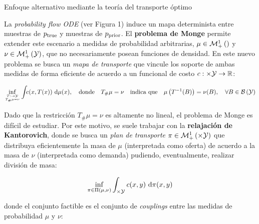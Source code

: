 \documentclass[final]{beamer}
\newlength{\colwidth}
\begin{document}
\begin{frame}[t]
\begin{columns}[t]
\begin{column}{\colwidth}
      \begin{block}{Enfoque alternativo mediante la teoría del transporte óptimo}

        La \textit{probability flow ODE} (ver Figura 1) induce un mapa determinista entre muestras de $p_{\operatorname{true}}$ y muestras de $p_{\operatorname{prior}}$. El \textbf{problema de Monge} permite extender este escenario a medidas de probabilidad arbitrarias, $\mu\in\mathcal{M}_+^1\left(\right)$ y $\nu\in\mathcal{M}_+^1\left(\mathcal{Y}\right)$, que no necesariamente posean funciones de densidad. En este nuevo problema se busca un \textit{mapa de transporte} que vincule los soporte de ambas medidas de forma eficiente de acuerdo a un funcional de costo $c:\times\mathcal{Y}\to\mathbb{R}$:

        \begin{equation*}
          \inf_{\feasible{T:\xspace\to\yspace}{T_\#\mu=\nu}}
          \int_{\xspace} c(x, T(x)) \d\mu(x),
          \quad\text{donde}\quad
          T_\#\mu=\nu\quad\text{indica que}\quad \mu\parent{T^{-1}(B)} = \nu(B),\quad \forall B\in \borel{\yspace}
        \end{equation*}

        Dado que la restricción $T_\#\mu=\nu$ es altamente no lineal, el problema de Monge es difícil de estudiar. Por este motivo, se suele trabajar con la \textbf{relajación de Kantorovich}, donde se busca un \textit{plan de transporte} $\pi\in\probmeasure{\xspace\times\yspace}$ que distribuya eficientemente la masa de $\mu$ (interpretada como oferta) de acuerdo a la masa de $\nu$ (interpretada como demanda) pudiendo, eventualmente, realizar división de masa:

        \noindent
        \begin{minipage}[t]{0.35\textwidth}
        \end{minipage}%
        \hfill
        \begin{minipage}[t]{0.6\textwidth}
          \vspace{0.5cm}
          \begin{equation}
            \label{eq:kantorovich}
            \inf_{\pi \in \Pi(\mu,\nu)} \int_{\times\mathcal{Y}} c(x, y) \,\operatorname{d}\!\pi(x, y)
          \end{equation}

          donde el conjunto factible es el conjunto de \textit{couplings} entre las medidas de probabilidad $\mu$ y $\nu$:


\end{minipage}
\end{block}
\end{column}
\end{columns}
\end{frame}
\end{document}
